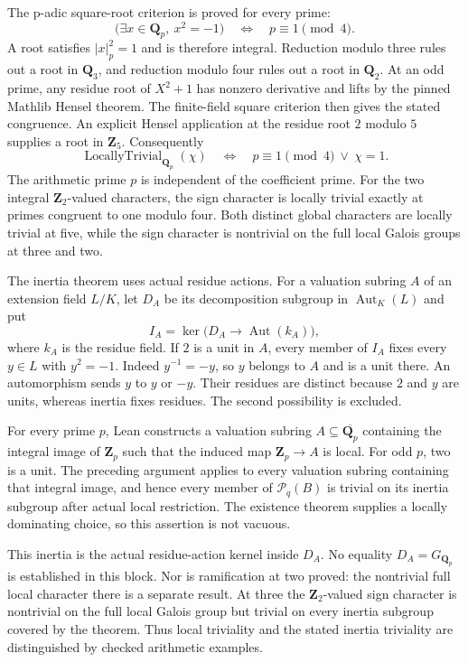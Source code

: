 \documentclass[11pt]{article}
\theoremstyle{definition}
\theoremstyle{remark}
\newcommand{\Z}{\mathbf Z}
\newcommand{\Q}{\mathbf Q}
\begin{document}
The p-adic square-root criterion is proved for every prime:
\[
\bigl(\exists x\in\Q_p,\ x^2=-1\bigr)
\quad\Longleftrightarrow\quad p\equiv1\pmod4.
\]
A root satisfies $\lvert x\rvert_p^2=1$ and is therefore integral.
Reduction modulo three rules out a root in $\Q_3$, and reduction modulo
four rules out a root in $\Q_2$. At an odd prime, any residue root of
$X^2+1$ has nonzero derivative and lifts by the pinned Mathlib Hensel
theorem. The finite-field square criterion then gives the stated
congruence. An explicit Hensel application at the residue root $2$ modulo $5$ supplies
a root in $\Z_5$. Consequently
\[
\boxed{
\operatorname{LocallyTrivial}_{\Q_p}(\chi)
\quad\Longleftrightarrow\quad p\equiv1\pmod4\ \lor\ \chi=1.
}
\]
The arithmetic prime $p$ is independent of the coefficient prime. For
the two integral $\Z_2$-valued characters, the sign character is locally
trivial exactly at primes congruent to one modulo four. Both distinct
global characters are locally trivial at five, while the sign character
is nontrivial on the full local Galois groups at three and two.

The inertia theorem uses actual residue actions. For a valuation subring
$A$ of an extension field $L/K$, let $D_A$ be its decomposition subgroup
in $\operatorname{Aut}_K(L)$ and put
\[
I_A=\ker\bigl(D_A\longrightarrow\operatorname{Aut}(k_A)\bigr),
\]
where $k_A$ is the residue field. If $2$ is a unit in $A$, every member
of $I_A$ fixes every $y\in L$ with $y^2=-1$. Indeed $y^{-1}=-y$, so
$y$ belongs to $A$ and is a unit there. An automorphism sends $y$ to
$y$ or $-y$. Their residues are distinct because $2$ and $y$ are units,
whereas inertia fixes residues. The second possibility is excluded.

For every prime $p$, Lean constructs a valuation subring
$A\subseteq\overline{\Q_p}$ containing the integral image of $\Z_p$
such that the induced map $\Z_p\to A$ is local. For odd $p$, two is
a unit. The preceding argument applies to every valuation subring
containing that integral image, and hence every member of
$\mathcal P_q(B)$ is trivial on its inertia subgroup after actual local
restriction. The existence theorem supplies a locally dominating choice,
so this assertion is not vacuous.

This inertia is the actual residue-action kernel inside $D_A$. No equality
$D_A=G_{\Q_p}$ is established in this block. Nor is ramification at two
proved: the nontrivial full local character there is a separate result.
At three the $\Z_2$-valued sign character is nontrivial on the full local
Galois group but trivial on every inertia subgroup covered by the theorem.
Thus local triviality and the stated inertia triviality are distinguished
by checked arithmetic examples.
\end{document}
